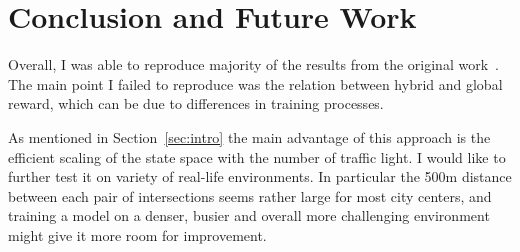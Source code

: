 \documentclass{article}
\begin{document}
    \section{Conclusion and Future Work}
    Overall, I was able to reproduce majority of the results from the original work~\cite{sumo}.
    The main point I failed to reproduce was the relation between hybrid and global reward, which can be due to differences in training processes.

    As mentioned in Section~\ref{sec:intro} the main advantage of this approach is the efficient scaling of the state space with the number of traffic light.
    I would like to further test it on variety of real-life environments.
    In particular the 500m distance between each pair of intersections seems rather large for most city centers,
    and training a model on a denser, busier and overall more challenging environment might give it more room for improvement.

    
    
\end{document}
